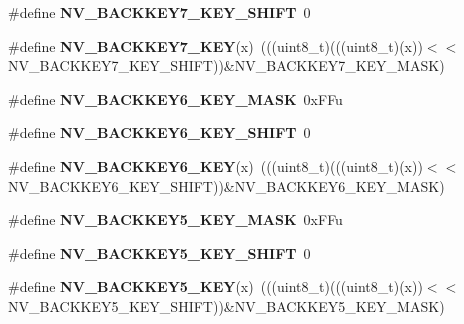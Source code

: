 \begin{DoxyCompactItemize}
\#define {\bfseries N\+V\+\_\+\+B\+A\+C\+K\+K\+E\+Y7\+\_\+\+K\+E\+Y\+\_\+\+S\+H\+I\+FT}~0
\item 
\mbox{\label{group___n_v___register___masks_ga2dbc4f6480af3ebaeeaf328a7f394c9f}} 
\#define {\bfseries N\+V\+\_\+\+B\+A\+C\+K\+K\+E\+Y7\+\_\+\+K\+EY}(x)~(((uint8\+\_\+t)(((uint8\+\_\+t)(x))$<$$<$N\+V\+\_\+\+B\+A\+C\+K\+K\+E\+Y7\+\_\+\+K\+E\+Y\+\_\+\+S\+H\+I\+FT))\&N\+V\+\_\+\+B\+A\+C\+K\+K\+E\+Y7\+\_\+\+K\+E\+Y\+\_\+\+M\+A\+SK)
\item 
\mbox{\label{group___n_v___register___masks_ga44e2d846ef1b9d5ad94a707fa6f29ae1}} 
\#define {\bfseries N\+V\+\_\+\+B\+A\+C\+K\+K\+E\+Y6\+\_\+\+K\+E\+Y\+\_\+\+M\+A\+SK}~0x\+F\+Fu
\item 
\mbox{\label{group___n_v___register___masks_ga271a532af55987843f56d660efb5d440}} 
\#define {\bfseries N\+V\+\_\+\+B\+A\+C\+K\+K\+E\+Y6\+\_\+\+K\+E\+Y\+\_\+\+S\+H\+I\+FT}~0
\item 
\mbox{\label{group___n_v___register___masks_ga0dc772c12f13eb390c75b52f2110f0f1}} 
\#define {\bfseries N\+V\+\_\+\+B\+A\+C\+K\+K\+E\+Y6\+\_\+\+K\+EY}(x)~(((uint8\+\_\+t)(((uint8\+\_\+t)(x))$<$$<$N\+V\+\_\+\+B\+A\+C\+K\+K\+E\+Y6\+\_\+\+K\+E\+Y\+\_\+\+S\+H\+I\+FT))\&N\+V\+\_\+\+B\+A\+C\+K\+K\+E\+Y6\+\_\+\+K\+E\+Y\+\_\+\+M\+A\+SK)
\item 
\mbox{\label{group___n_v___register___masks_gab1e58bd037f31bcaa1b96a71340315ba}} 
\#define {\bfseries N\+V\+\_\+\+B\+A\+C\+K\+K\+E\+Y5\+\_\+\+K\+E\+Y\+\_\+\+M\+A\+SK}~0x\+F\+Fu
\item 
\mbox{\label{group___n_v___register___masks_ga68762e18611e6dfaed3ddfd7847c09f4}} 
\#define {\bfseries N\+V\+\_\+\+B\+A\+C\+K\+K\+E\+Y5\+\_\+\+K\+E\+Y\+\_\+\+S\+H\+I\+FT}~0
\item 
\mbox{\label{group___n_v___register___masks_ga07bc019ba659fc1b38053c8f191371b6}} 
\#define {\bfseries N\+V\+\_\+\+B\+A\+C\+K\+K\+E\+Y5\+\_\+\+K\+EY}(x)~(((uint8\+\_\+t)(((uint8\+\_\+t)(x))$<$$<$N\+V\+\_\+\+B\+A\+C\+K\+K\+E\+Y5\+\_\+\+K\+E\+Y\+\_\+\+S\+H\+I\+FT))\&N\+V\+\_\+\+B\+A\+C\+K\+K\+E\+Y5\+\_\+\+K\+E\+Y\+\_\+\+M\+A\+SK)
$$
\end{DoxyCompactItemize}

